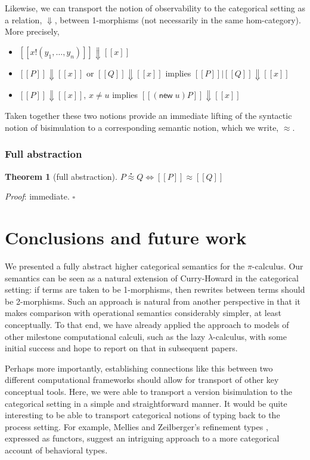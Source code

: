 \documentclass[]{acm_proc_article-sp}
\newcommand{\ldb}{[\![}
\newcommand{\rdb}{]\!]}
\newcommand{\id}[1]{\texttt{#1}}
\newcommand{\juxtap}{\mathbin{\id{|}}}
\newcommand{\meaningof}[1]{\ldb #1 \rdb}
\newcommand{\wbbisim}{\stackrel{\centerdot}{\approx}} %
\newcommand{\wbbisimsem}{\approx} %
\newtheorem{thm}{Theorem}[subsection]
\numberwithin{equation}{subsection}
\newcommand{\pic}{$\pi$-calculus}
\begin{document}
Likewise, we can transport the notion of observability to the
categorical setting as a relation, $\Downarrow$, between 1-morphisms (not necessarily
in the same hom-category). More precisely,

\begin{itemize}
  \item $\meaningof{x!(y_1,\ldots,y_n)} \Downarrow \meaningof{x}$
  \item $\meaningof{P} \Downarrow \meaningof{x}$ or $\meaningof{Q} \Downarrow \meaningof{x}$ implies $\meaningof{P} \juxtap \meaningof{Q} \Downarrow \meaningof{x}$
  \item $\meaningof{P} \Downarrow \meaningof{x}$, $x \neq u$ implies $\meaningof{(\mathsf{new}\; u)P} \Downarrow \meaningof{x}$
\end{itemize}

Taken together these two notions provide an immediate lifting of the syntactic
notion of bisimulation to a corresponding semantic notion, which we write, $\wbbisimsem$.

\subsubsection{Full abstraction}

\begin{thm}[full abstraction]
  $P \wbbisim Q \iff \meaningof{P} \wbbisimsem \meaningof{Q}$     
\end{thm}

\emph{Proof}: immediate. \hfill $\square$

\section{Conclusions and future work}
We presented a fully abstract higher categorical semantics for the
{\pic}. Our semantics can be seen as a natural extension of
Curry-Howard in the categorical setting: if terms are taken to be
1-morphisms, then rewrites between terms should be 2-morphisms. Such
an approach is natural from another perspective in that it makes
comparison with operational semantics considerably simpler, at least
conceptually. To that end, we have already applied the approach to
models of other milestone computational calculi, such as the lazy
$\lambda$-calculus, with some initial success and hope to report on
that in subsequent papers. 

Perhaps more importantly, establishing connections like this between
two different computational frameworks should allow for transport of
other key conceptual tools. Here, we were able to transport a version
bisimulation to the categorical setting in a simple and
straightforward manner. It would be quite interesting to be able to
transport categorical notions of typing back to the process
setting. For example, Mellies and Zeilberger's refinement types
\cite{DBLP:conf/popl/MelliesZ15}, expressed as functors, suggest an
intriguing approach to a more categorical account of behavioral types.
\end{document}
